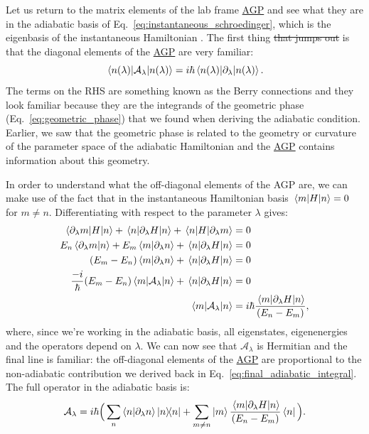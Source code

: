 \documentclass[a4paper,oneside,11pt]{book}
\newcommand{\dlambda}{\partial_{\lambda}}
\newcommand{\AGP}[1]{\mathcal{A}_{#1}}
\newcommand{\acrref}[1]{\hyperref[acr:#1]{#1}}
\providecommand{\DIFaddtex}[1]{{\protect\color{blue}\uwave{#1}}} %
\providecommand{\DIFdeltex}[1]{{\protect\color{red}\sout{#1}}}                      %
\providecommand{\DIFaddbegin}{} %
\providecommand{\DIFaddend}{} %
\providecommand{\DIFdelbegin}{} %
\providecommand{\DIFdelend}{} %
\providecommand{\DIFadd}[1]{\texorpdfstring{\DIFaddtex{#1}}{#1}} %
\providecommand{\DIFdel}[1]{\texorpdfstring{\DIFdeltex{#1}}{}} %
\newcommand{\DIFscaledelfig}{0.5}
\newlength{\DIFdelgraphicswidth} %
\newlength{\DIFdelgraphicsheight} %
\newcommand{\DIFaddincludegraphics}[2][]{{\color{blue}\fbox{\DIFOincludegraphics[#1]{#2}}}} %
\newcommand{\DIFdelincludegraphics}[2][]{%
\sbox{\DIFdelgraphicsbox}{\DIFOincludegraphics[#1]{#2}}%
\settoboxwidth{\DIFdelgraphicswidth}{\DIFdelgraphicsbox} %
\settoboxtotalheight{\DIFdelgraphicsheight}{\DIFdelgraphicsbox} %
\scalebox{\DIFscaledelfig}{%
\parbox[b]{\DIFdelgraphicswidth}{\usebox{\DIFdelgraphicsbox}\\[-\baselineskip] \rule{\DIFdelgraphicswidth}{0em}}\llap{\resizebox{\DIFdelgraphicswidth}{\DIFdelgraphicsheight}{%
\setlength{\unitlength}{\DIFdelgraphicswidth}%
\begin{picture}(1,1)%
\thicklines\linethickness{2pt} %
{\color[rgb]{1,0,0}\put(0,0){\framebox(1,1){}}}%
{\color[rgb]{1,0,0}\put(0,0){\line( 1,1){1}}}%
{\color[rgb]{1,0,0}\put(0,1){\line(1,-1){1}}}%
\end{picture}%
}\hspace*{3pt}}} %
} %
\DeclareRobustCommand{\DIFaddbegin}{\DIFOaddbegin \let\includegraphics\DIFaddincludegraphics} %
\DeclareRobustCommand{\DIFaddend}{\DIFOaddend \let\includegraphics\DIFOincludegraphics} %
\DeclareRobustCommand{\DIFdelbegin}{\DIFOdelbegin \let\includegraphics\DIFdelincludegraphics} %
\DeclareRobustCommand{\DIFdelend}{\DIFOaddend \let\includegraphics\DIFOincludegraphics} %
\begin{document}
    Let us return to the matrix elements of the lab frame \acrref{AGP} and see what they are in the adiabatic basis of Eq.~\eqref{eq:instantaneous_schroedinger}, which is the eigenbasis of the instantaneous Hamiltonian \DIFaddbegin \DIFadd{as it varies in time}\DIFaddend . The first thing \DIFdelbegin \DIFdel{that jumps out }\DIFdelend \DIFaddbegin \DIFadd{to notice }\DIFaddend is that the diagonal elements of the \acrref{AGP} are very familiar:
    \begin{equation}\label{eq:AGP_diagonal}
        \mel{n(\lambda)}{\AGP{\lambda}}{n(\lambda)} = i\hbar \mel{n(\lambda)}{\dlambda}{n(\lambda)}.
    \end{equation}
    The terms on the RHS are something known as the Berry connections and they look familiar because they are the integrands of the geometric phase (Eq.~\eqref{eq:geometric_phase}) that we found when deriving the adiabatic condition. Earlier, we saw that the geometric phase is related to the geometry or curvature of the parameter space of the adiabatic Hamiltonian and the \acrref{AGP} contains information about this geometry. 

    In order to understand what the off-diagonal elements of the AGP are, we can make use of the fact that in the instantaneous Hamiltonian basis $\mel{m}{H}{n} = 0$ for $m \neq n$. Differentiating with respect to the parameter $\lambda$ gives:
    \begin{equation}\label{eq:differentiating_adiabatic_offdiagonals}
       \begin{aligned}
           \mel{\dlambda m}{H}{n} + \mel{n}{\dlambda H}{n} + \mel{n}{H}{\dlambda m} &= 0 \\
           E_n \braket{\dlambda m}{n} + E_m \braket{m}{\dlambda n} + \mel{n}{\dlambda H}{n} &= 0 \\
           (E_m - E_n) \braket{m}{\dlambda n} + \mel{n}{\dlambda H}{n} &= 0 \\
           \frac{-i}{\hbar} (E_m - E_n) \mel{m}{\AGP{\lambda}}{n} + \mel{n}{\dlambda H}{n} &= 0 \\
           \mel{m}{\AGP{\lambda}}{n} &= i\hbar \frac{\mel{m}{\dlambda H}{n}}{(E_n - E_m)},
       \end{aligned} 
    \end{equation}
    where, since we're working in the adiabatic basis, all eigenstates, eigenenergies and the operators depend on $\lambda$. We can now see that $\AGP{\lambda}$ is Hermitian and the final line is familiar: the off-diagonal elements of the \acrref{AGP} are proportional to the non-adiabatic contribution we derived back in Eq.~\eqref{eq:final_adiabatic_integral}. The full operator in the adiabatic basis is:
    \begin{equation}\label{eq:AGP_adiabatic_basis}
        \AGP{\lambda} = i\hbar\Big(\sum_n \braket{n}{\dlambda n} \dyad{n} + \sum_{m \neq n} \ket{m} \frac{\mel{m}{\dlambda H}{n}}{(E_n - E_m)} \bra{n} \Big).
    \end{equation}
\end{document}
